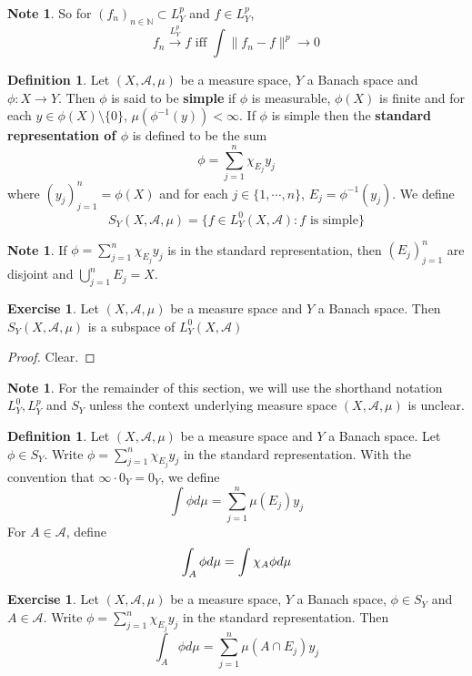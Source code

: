 \documentclass[12pt]{amsart}
\theoremstyle{definition}
\newtheorem{defn}[definition]{Definition}
\newtheorem{note}[definition]{Note}
\newtheorem{ex}[definition]{Exercise}
\newcommand{\N}{\mathbb{N}}
\newcommand{\MA}{\mathcal{A}}
\newcommand{\conv}[1]{\xrightarrow{#1}}
\begin{document}
	\begin{note}
	So for $(f_n)_{n \in \N} \subset L^p_Y$ and $f \in L^p_Y$, $$f_n \conv{L^p_Y} f \text{ iff } \int \|f_n - f\|^p \rightarrow 0$$ 
	\end{note}
	
	\begin{defn}
	Let $(X, \MA, \mu)$ be a measure space, $Y$ a Banach space and $\phi: X \rightarrow Y$. Then $\phi$ is said to be \textbf{simple} if $\phi$ is measurable, $\phi(X)$ is finite and for each $y \in \phi(X) \setminus \{0\}$, $\mu(\phi^{-1}(y)) < \infty$. If $\phi$ is simple then the \textbf{standard representation of $\phi$} is defined to be the sum $$\phi = \sum\limits_{j=1}^n \chi_{E_j}y_j$$ where $(y_j)_{j=1}^n = \phi(X)$ and for each $j \in \{1, \cdots, n\}$, $E_j = \phi^{-1}(y_j)$. We define $$S_Y(X, \MA, \mu) = \{f \in L_Y^0(X, \MA): f \text{ is simple}\}$$
	\end{defn}
	
	\begin{note}
	If $\phi = \sum\limits_{j=1}^n \chi_{E_j}y_j$ is in the standard representation, then $(E_j)_{j=1}^n$ are disjoint and $\bigcup\limits_{j=1}^n E_j = X$.
	\end{note}
	
	\begin{ex}
	Let $(X, \MA, \mu)$ be a measure space and $Y$ a Banach space. Then $S_Y(X, \MA, \mu)$ is a subspace of $L_Y^0(X, \MA)$
	\end{ex}
	
	\begin{proof}
	Clear.
	\end{proof}
	
	\begin{note}
	For the remainder of this section, we will use the shorthand notation $L^0_Y, L^p_Y$ and $S_Y$ unless the context underlying measure space $(X, \MA, \mu)$ is unclear.
	\end{note}
	
	\begin{defn}
	Let $(X, \MA, \mu)$ be a measure space and $Y$ a Banach space. Let $\phi \in S_Y$. Write $\phi = \sum\limits_{j=1}^n\chi_{E_j}y_j$ in the standard representation. With the convention that $\infty \cdot 0_Y = 0_Y$, we define $$\int \phi d\mu = \sum\limits_{j=1}^n \mu(E_j)y_j $$ For $A \in \MA$, define  $$\int_A \phi d \mu = \int \chi_A \phi d\mu \\$$
	\end{defn}
	
	\begin{ex}
	Let $(X, \MA, \mu)$ be a measure space, $Y$ a Banach space, $\phi \in S_Y$ and $A \in \MA$. Write $\phi = \sum\limits_{j=1}^n\chi_{E_j}y_j$ in the standard representation. Then $$\int_A \phi d\mu = \sum_{j=1}^n \mu(A \cap E_j)y_j$$
	\end{ex}
	
\end{document}
